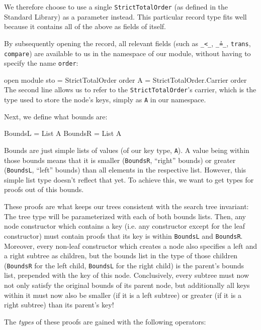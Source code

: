 \documentclass{scrartcl}
\newenvironment{code}{\verbatim}{\endverbatim}
\begin{document}
We therefore choose to use a single \verb/StrictTotalOrder/ (as
defined in the Standard Library) as a parameter instead. This
particular record type fits well because it contains
all of the above as fields of itself.

By subsequently opening the record, all relevant fields (such as
\verb/_<_/, \verb/_≟_/, \verb/trans/, \verb/compare/) are available to
us in the namespace of our module, without having to specify the name
\verb/order/:

\nopagebreak
\begin{code}
open module sto = StrictTotalOrder order
A = StrictTotalOrder.Carrier order
\end{code}
The second line allows us to refer to the \verb/StrictTotalOrder/'s
carrier, which is the type used to store the node's keys, simply as
\verb/A/ in our namespace.

Next, we define what bounds are:

\begin{code}
BoundsL = List A
BoundsR = List A
\end{code}

Bounds are just simple lists of values (of our key type, \verb/A/). A
value being within those bounds means that it is smaller
(\verb/BoundsR/, ``right'' bounds) or greater (\verb/BoundsL/,
``left'' bounds) than all elements in the respective list. However,
this simple list type doesn't reflect that yet. To achieve this, we
want to get types for proofs out of this bounds.

These proofs are what keeps our trees consistent with the search tree
invariant: The tree type will be parameterized with each of both
bounds lists. Then, any node constructor which contains a key
(i.e. any constructor except for the leaf constructor) must contain
proofs that its key is within \verb/BoundsL/ and
\verb/BoundsR/. Moreover, every non-leaf constructor which creates a
node also specifies a left and a right subtree as children, but the
bounds list in the type of those children (\verb/BoundsR/ for the left
child, \verb/BoundsL/ for the right child) is the parent's bounds
list, prepended with the key of this node. Conclusively, every subtree
must now not only satisfy the original bounds of its parent node, but
additionally all keys within it must now also be smaller (if it is a
left subtree) or greater (if it is a right subtree) than its parent's
key!

The \emph{types} of these proofs are gained with the following operators:
\end{document}
